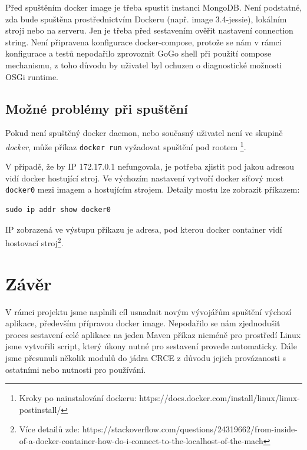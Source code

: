 \documentclass[12pt, a4paper]{article}
\begin{document}
Před spuštěním docker image je třeba spustit instanci MongoDB. Není podstatné, zda bude spuštěna prostřednictvím Dockeru (např. image 3.4-jessie), lokálním stroji nebo na serveru. Jen je třeba před sestavením ověřit nastavení connection string. Není připravena konfigurace docker-compose, protože se nám v rámci konfigurace a testů nepodařilo zprovoznit GoGo shell při použití compose mechanismu, z toho důvodu by uživatel byl ochuzen o diagnostické možnosti OSGi runtime.


\subsection{Možné problémy při spuštění}
Pokud není spuštěný docker daemon, nebo současný uživatel není ve skupině \textit{docker}, může příkaz \verb|docker run| vyžadovat spuštění pod rootem \footnote{Kroky po nainstalování dockeru: https://docs.docker.com/install/linux/linux-postinstall/}.

V případě, že by IP 172.17.0.1 nefungovala, je potřeba zjistit pod jakou adresou vidí docker hostující stroj. Ve výchozím nastavení vytvoří docker síťový most \verb|docker0| mezi imagem a hostujícím strojem. Detaily mostu lze zobrazit příkazem: 

\begin{verbatim}
sudo ip addr show docker0
\end{verbatim}

IP zobrazená ve výstupu příkazu je adresa, pod kterou docker container vidí hostovací stroj\footnote{Více detailů zde: https://stackoverflow.com/questions/24319662/from-inside-of-a-docker-container-how-do-i-connect-to-the-localhost-of-the-mach}.

\newpage
\section{Závěr}  %

V rámci projektu jsme naplnili cíl usnadnit novým vývojářům spuštění výchozí aplikace, především přípravou docker image. Nepodařilo se nám zjednodušit proces sestavení celé aplikace na jeden Maven příkaz nicméně pro prostředí Linux jsme vytvořili script, který úkony nutné pro sestavení provede automaticky.
Dále jsme přesunuli několik modulů do jádra CRCE z důvodu jejich provázanosti s ostatními nebo nutnosti pro používání. 
\end{document}
